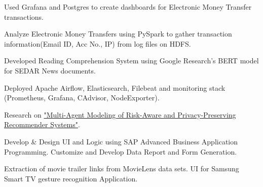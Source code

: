 \documentclass[]{Vishnu-Resume}
\begin{document}
\begin{minipage}[t]{0.66\textwidth}
\begin{tightemize}
\item Used Grafana and Postgres to create dashboards for Electronic Money Transfer transactions.
\item Analyze Electronic Money Transfers using PySpark to gather transaction information(Email ID, Acc No., IP) from log files on HDFS.
\item Developed Reading Comprehension System using Google Research's BERT model for SEDAR News documents.
\end{tightemize}
\sectionsep

\begin{tightemize}
\item Deployed Apache Airflow, Elasticsearch, Filebeat and monitoring stack (Prometheus, Grafana, CAdvisor, NodeExporter).
\end{tightemize}
\sectionsep

\begin{tightemize}
\item Research on {\href{https://uwspace.uwaterloo.ca/handle/10012/11732}{"Multi-Agent Modeling of Risk-Aware and Privacy-Preserving Recommender Systems"}}.
\end{tightemize}
\sectionsep

\begin{tightemize}
\item Develop \& Design UI and Logic using SAP Advanced Business Application
Programming. Customize and Develop Data Report and Form Generation.
\end{tightemize}
\sectionsep

\begin{tightemize}
\item Extraction of movie trailer links from MovieLens data sets. UI for Samsung Smart TV gesture recognition Application.
\end{tightemize}
\sectionsep



\end{minipage}
\end{document}
